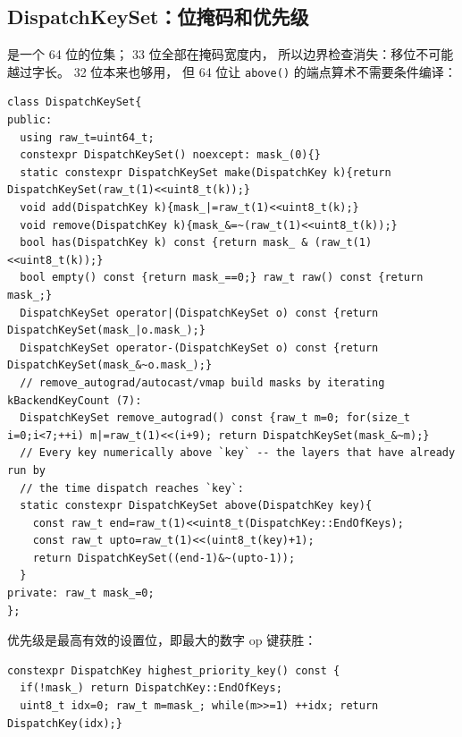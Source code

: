 \subsection{DispatchKeySet：位掩码和优先级}

\label{sec:keyset}

是一个 64 位的位集； 33 位全部在掩码宽度内，
所以边界检查消失：移位不可能越过字长。 32 位本来也够用，
但 64 位让 \texttt{above()} 的端点算术不需要条件编译：

\begin{lstlisting}[caption={bitmask.}, label=lst:keysetdef]
class DispatchKeySet{
public:
  using raw_t=uint64_t;
  constexpr DispatchKeySet() noexcept: mask_(0){}
  static constexpr DispatchKeySet make(DispatchKey k){return DispatchKeySet(raw_t(1)<<uint8_t(k));}
  void add(DispatchKey k){mask_|=raw_t(1)<<uint8_t(k);}
  void remove(DispatchKey k){mask_&=~(raw_t(1)<<uint8_t(k));}
  bool has(DispatchKey k) const {return mask_ & (raw_t(1)<<uint8_t(k));}
  bool empty() const {return mask_==0;} raw_t raw() const {return mask_;}
  DispatchKeySet operator|(DispatchKeySet o) const {return DispatchKeySet(mask_|o.mask_);}
  DispatchKeySet operator-(DispatchKeySet o) const {return DispatchKeySet(mask_&~o.mask_);}
  // remove_autograd/autocast/vmap build masks by iterating kBackendKeyCount (7):
  DispatchKeySet remove_autograd() const {raw_t m=0; for(size_t i=0;i<7;++i) m|=raw_t(1)<<(i+9); return DispatchKeySet(mask_&~m);}
  // Every key numerically above `key` -- the layers that have already run by
  // the time dispatch reaches `key`:
  static constexpr DispatchKeySet above(DispatchKey key){
    const raw_t end=raw_t(1)<<uint8_t(DispatchKey::EndOfKeys);
    const raw_t upto=raw_t(1)<<(uint8_t(key)+1);
    return DispatchKeySet((end-1)&~(upto-1));
  }
private: raw_t mask_=0;
};
\end{lstlisting}

优先级是最高有效的设置位，即最大的数字 \ac{op} 键获胜：

\begin{lstlisting}[caption={scan high $\rightarrow$ low.}, label=lst:highestkey]
constexpr DispatchKey highest_priority_key() const {
  if(!mask_) return DispatchKey::EndOfKeys;
  uint8_t idx=0; raw_t m=mask_; while(m>>=1) ++idx; return DispatchKey(idx);}
\end{lstlisting}

